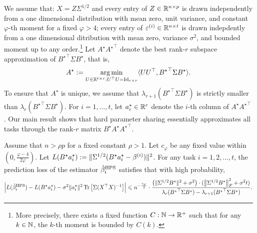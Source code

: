 We assume that: $X = Z \Sigma^{1/2}$ and every entry of $Z \in \mathbb{R}^{n \times p}$ is drawn independently from a one dimensional distribution with mean zero, unit variance, and constant $\varphi$-th moment for a fixed $\varphi > 4$;
every entry of $\varepsilon^{(i)} \in \mathbb{R}^{n \times t}$ is drawn indepdently from a one dimensional ditribution with mean zero, variance $\sigma^2$, and bounded moment up to any order.\footnote{More precisely, there exists a fixed function $C: \mathbb{N} \rightarrow \mathbb{R}^+$ such that for any $k \in \mathbb{N}$, the $k$-th moment is bounded by $C(k)$.}
Let $A^{\star} {A^{\star}}^{\top}$ denote the best rank-$r$ subspace approximation of ${B^{\star}}^\top\Sigma B^{\star}$, that is,
\[ A^{\star} := \operatorname*{arg\,min}_{U\in\mathbb{R}^{t\times r} : U^{\top} U = \operatorname{Id}_{r\times r}} \langle U U^{\top}, {B^{\star}}^{\top} \Sigma B^{\star} \rangle. \]
To ensure that $A^{\star}$ is unique, we assume that $\lambda_{r+1}({B^\star}^\top \Sigma B^\star)$ is strictly smaller than $\lambda_{r}({B^\star}^\top \Sigma B^\star)$.
For $i = 1,\dots, t$, let $a_i^{\star} \in\mathbb{R}^r$ denote the $i$-th column of $A^{\star}{A^{\star}}^{\top}$. 
Our main result shows that hard parameter sharing essentially approximates all tasks through the rank-$r$ matrix $B^{\star} A^{\star} {A^{\star}}^{\top}$.

\begin{theorem}\label{thm_many_tasks}
	Assume that $n > \rho p$ for a fixed constant $\rho > 1$.
	Let $c_{\varphi}$ be any fixed value within $(0, \frac{\varphi-4}{2\varphi})$.
	Let $L(B^{\star}a_i^{\star}): = \|\Sigma^{1/2} (B^{\star} a_i^{\star}- \beta^{(i)})\|^2$.
	For any task $i = 1, 2, \dots, t$, the prediction loss of the estimator $\hat{\beta}_i^{\textup{HPS}}$ satisfies that with high probability,
	\begin{align*}
		{\left| {L(\hat{\beta}_i^{\textup{HPS}}) - L(B^{\star}a_i^{\star}) - \sigma^2 \|a_i^{\star}\|^2 \operatorname{Tr}\left[\Sigma (X^{\top}X)^{-1}\right]} \right|}
		\leqslant n^{-\frac{c_{\varphi}}2} \cdot \frac{\left({ \|\Sigma^{1/2} B^{\star}\|^2+  \sigma^2}\right) \cdot (\left\| \Sigma^{1/2} B^{\star} \right\|_{F}^2 + \sigma^2 t)} {\lambda_r ({B^\star}^\top \Sigma B^\star)- \lambda_{r+1}({B^\star}^\top \Sigma B^\star)}.
	\end{align*}
\end{theorem}

